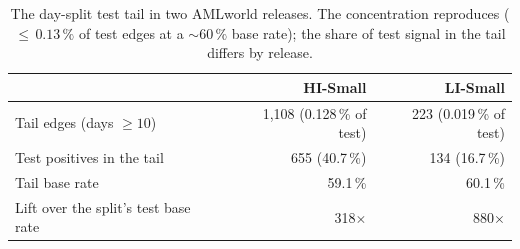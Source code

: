 \begin{table}[t]
\centering
\caption{The day-split test tail in two AMLworld releases. The concentration reproduces
(${\le}\,0.13\,\%$ of test edges at a ${\sim}60\,\%$ base rate); the share of test signal in
the tail differs by release.}
\label{tab:tail}
\begin{tabular}{lrr}
\toprule
 & HI-Small & LI-Small \\
\midrule
Tail edges (days $\ge 10$) & 1{,}108 (0.128\,\% of test) & 223 (0.019\,\% of test) \\ %
Test positives in the tail & 655 (40.7\,\%) & 134 (16.7\,\%) \\ %
Tail base rate & 59.1\,\% & 60.1\,\% \\ %
Lift over the split's test base rate & 318$\times$ & 880$\times$ \\ %
\bottomrule
\end{tabular}
\end{table}
